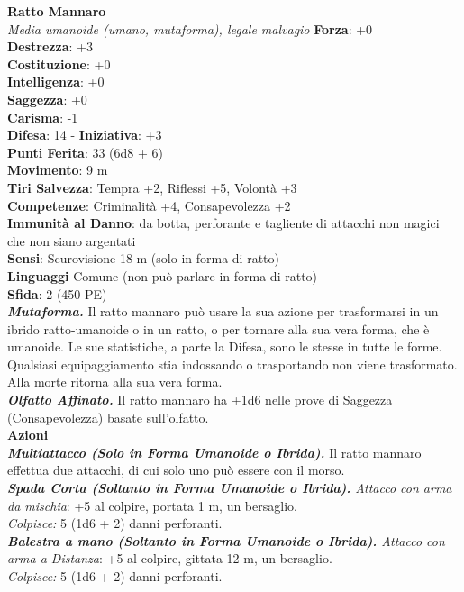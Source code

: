 \begin{multicols}{2}
\medskip\textbf{Ratto Mannaro}\\
\emph{Media umanoide (umano, mutaforma), legale malvagio}
\textbf{Forza}: +0\\
\textbf{Destrezza}: +3\\
\textbf{Costituzione}: +0\\
\textbf{Intelligenza}: +0\\
\textbf{Saggezza}: +0\\
\textbf{Carisma}: -1\\
\textbf{Difesa}: 14 - \textbf{Iniziativa}: +3\\
\textbf{Punti Ferita}: 33 (6d8 + 6)\\
\textbf{Movimento}: 9 m\\
\textbf{Tiri Salvezza}: Tempra +2, Riflessi +5, Volontà +3\\
\textbf{Competenze}: Criminalità +4, Consapevolezza +2\\
\textbf{Immunità al Danno}: da botta, perforante e tagliente di attacchi non magici che non siano argentati\\
\textbf{Sensi}: Scurovisione 18 m (solo in forma di ratto)\\
\textbf{Linguaggi} Comune (non può parlare in forma di ratto)\\
\textbf{Sfida}: 2 (450 PE)\smallskip\\
\emph{\textbf{Mutaforma.}} Il ratto mannaro può usare la sua azione per trasformarsi in un ibrido ratto-umanoide o in un ratto, o per tornare alla sua vera forma, che è umanoide. Le sue statistiche, a parte la Difesa, sono le stesse in tutte le forme. Qualsiasi equipaggiamento stia indossando o trasportando non viene trasformato. Alla morte ritorna alla sua vera forma.\\
\emph{\textbf{Olfatto Affinato.}} Il ratto mannaro ha +1d6 nelle prove di Saggezza (Consapevolezza) basate sull'olfatto.\\
\smallskip\textbf{Azioni}\\

\emph{\textbf{Multiattacco (Solo in Forma Umanoide o Ibrida).}} Il ratto mannaro effettua due attacchi, di cui solo uno può essere con il morso.\\
\emph{\textbf{Spada Corta (Soltanto in Forma Umanoide o Ibrida).} Attacco con arma da mischia}: +5 al colpire, portata 1 m, un bersaglio.\\
\emph{Colpisce:} 5 (1d6 + 2) danni perforanti.\\

\emph{\textbf{Balestra a mano (Soltanto in Forma Umanoide o Ibrida).} Attacco con arma a Distanza}: +5 al colpire, gittata 12 m, un bersaglio.\\
\emph{Colpisce:} 5 (1d6 + 2) danni perforanti.\\


\end{multicols}
